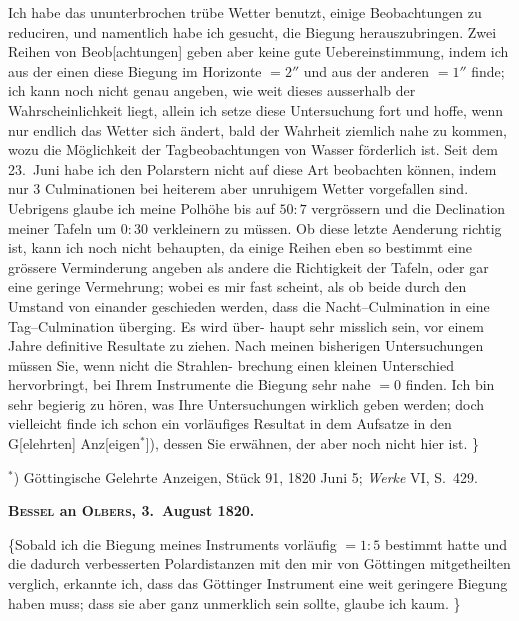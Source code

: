 \documentclass[12pt,a4paper]{article}
\theoremstyle{plain}
\theoremstyle{definition}
\theoremstyle{remark}
\begin{document}
Ich habe das ununterbrochen tr\"{u}be Wetter benutzt, einige Beobachtungen
zu reduciren, und namentlich habe ich gesucht, die Biegung herauszubringen.
Zwei Reihen von Beob[achtungen] geben aber keine gute Uebereinstimmung,
indem ich aus der einen diese Biegung im Horizonte $= 2''$ und aus der anderen
$= 1''$ finde; ich kann noch nicht genau angeben, wie weit dieses ausserhalb
der Wahrscheinlichkeit liegt, allein ich setze diese Untersuchung fort und
hoffe, wenn nur endlich das Wetter sich \"{a}ndert, bald der Wahrheit ziemlich
nahe zu kommen, wozu die M\"{o}glichkeit der Tagbeobachtungen von Wasser
f\"{o}rderlich ist. Seit dem 23.\ Juni habe ich den Polarstern nicht auf diese Art
beobachten k\"{o}nnen, indem nur 3 Culminationen bei heiterem aber unruhigem
Wetter vorgefallen sind. Uebrigens glaube ich meine Polh\"{o}he bis auf $50\!\!:\!\!7$
vergr\"{o}ssern und die Declination meiner Tafeln um $0\!\!:\!\!30$ verkleinern zu m\"{u}ssen.
Ob diese letzte Aenderung richtig ist, kann ich noch nicht behaupten, da
einige Reihen eben so bestimmt eine gr\"{o}ssere Verminderung angeben als andere
die Richtigkeit der Tafeln, oder gar eine geringe Vermehrung; wobei es mir
fast scheint, als ob beide durch den Umstand von einander geschieden werden,
dass die Nacht--Culmination in eine Tag--Culmination \"{u}berging. Es wird \"{u}ber-
haupt sehr misslich sein, vor einem Jahre definitive Resultate zu ziehen. \dotfill
Nach meinen bisherigen Untersuchungen m\"{u}ssen Sie, wenn nicht die Strahlen-
brechung einen kleinen Unterschied hervorbringt, bei Ihrem Instrumente die
Biegung sehr nahe $= 0$ finden. Ich bin sehr begierig zu h\"{o}ren, was Ihre
Untersuchungen wirklich geben werden; doch vielleicht finde ich schon ein
vorl\"{a}ufiges Resultat in dem Aufsatze in den G[elehrten] Anz[eigen$^*$]), dessen
Sie erw\"{a}hnen, der aber noch nicht hier ist. \dotfill\}

\smallskip
$^*$) G\"{o}ttingische Gelehrte Anzeigen, St\"{u}ck 91, 1820 Juni 5; \textit{Werke} VI, S.\ 429.

\medskip
\begin{center}
\textbf{\textsc{Bessel} an \textsc{Olbers}, 3.\ August 1820.}
\end{center}

\medskip
\{\dotfill Sobald ich die Biegung meines Instruments vorl\"{a}ufig $= 1\!\!:\!\!5$
bestimmt hatte und die dadurch verbesserten Polardistanzen mit den mir von
G\"{o}ttingen mitgetheilten verglich, erkannte ich, dass das G\"{o}ttinger Instrument
eine weit geringere Biegung haben muss; dass sie aber ganz unmerklich sein
sollte, glaube ich kaum. \dotfill\}
\end{document}
